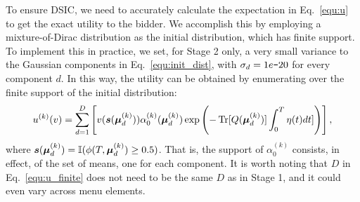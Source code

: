 To ensure DSIC, we need to accurately calculate the expectation in Eq.~\ref{equ:u} to get the exact
utility to the bidder. We accomplish this by employing a mixture-of-Dirac distribution as the initial distribution, which has finite support. To implement this in practice, we set, for Stage 2 only, a very small variance to the Gaussian components in Eq.~\ref{equ:init_dist}, with $\sigma_d=1e\textup{\texttt{-}} 20$ for every component $d$. In this way, the utility can be obtained by enumerating over the finite support of the initial distribution:
\begin{align}
    u^{(k)}(v) = \sum_{d=1}^D \left[v({\bm{s}}(\bm\mu^{(k)}_d)) \alpha^{(k)}_0(\bm\mu^{(k)}_d)\exp\left(-\operatorname{Tr}[Q(\bm\mu^{(k)}_d)]\int_0^T \eta(t) dt]\right)\right],\label{equ:u_finite}
\end{align}
where ${\bm{s}}(\bm\mu^{(k)}_d)=\mathbb{I}(\phi(T,\bm\mu^{(k)}_d)\ge 0.5)$. 
That is, the support of $\alpha^{(k)}_0$ 
consists, in effect, of the set of means, one for each component. %
It is worth noting that $D$ in Eq.~\ref{equ:u_finite} does not need to be the same $D$ as in Stage 1, and it could even vary across menu elements.


